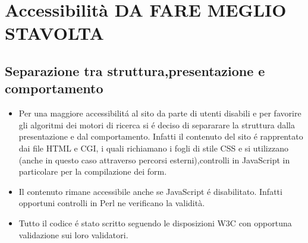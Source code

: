 \documentclass[12pt]{article}
\begin{document}
		\section{Accessibilit\`a DA FARE MEGLIO STAVOLTA}
		\subsection{Separazione tra struttura,presentazione e comportamento}
		\begin{itemize}
			\item Per una maggiore accessibilit\'a al sito da parte di utenti disabili e per favorire gli algoritmi dei motori di ricerca si \'e deciso di separarare la struttura dalla presentazione e dal comportamento.
			Infatti il contenuto del sito \'e rapprentato dai file HTML e CGI, i quali richiamano i fogli di stile CSS e si utilizzano (anche in questo caso attraverso percorsi esterni),controlli in JavaScript in particolare per la compilazione dei form. 

			\item Il contenuto rimane accessibile anche se JavaScript \'e disabilitato. Infatti opportuni controlli in Perl ne verificano la validit\`a.

			\item Tutto il codice \'e stato scritto seguendo le disposizioni W3C con opportuna validazione sui loro validatori.
		\end{itemize}
\end{document}
